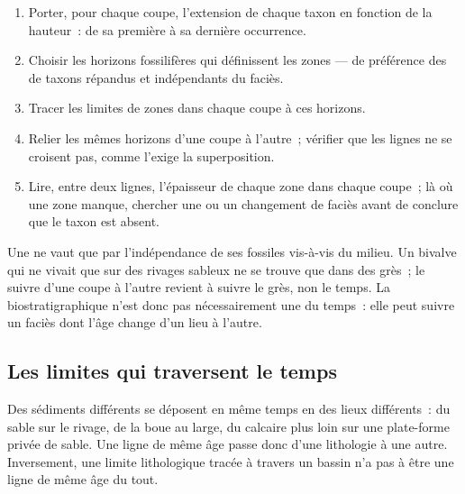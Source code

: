 \begin{method}\label{met:b1:stratigraphic-scale:biozones}
\begin{enumerate}
  \item Porter, pour chaque coupe, l'extension de chaque taxon en fonction de la hauteur~: de
        sa première à sa dernière occurrence.
  \item Choisir les horizons fossilifères qui définissent les zones --- de préférence des  de taxons répandus et indépendants du faciès.
  \item Tracer les limites de zones dans chaque coupe à ces horizons.
  \item Relier les mêmes horizons d'une coupe à l'autre~; vérifier que les lignes
        ne se croisent pas, comme l'exige la superposition.
  \item Lire, entre deux lignes, l'épaisseur de chaque zone dans chaque coupe~;
        là où une zone manque, chercher une  ou un changement de
        faciès avant de conclure que le taxon est absent.
\end{enumerate}
\end{method}

Une  ne vaut que par l'indépendance de ses fossiles vis-à-vis du
milieu. Un bivalve qui ne vivait que sur des rivages sableux ne se trouve que dans des
grès~; le suivre d'une coupe à l'autre revient à suivre le grès, non le
temps. La  biostratigraphique n'est donc pas nécessairement une 
du temps~: elle peut suivre un faciès dont l'âge change d'un lieu à l'autre.

\subsection*{Les limites qui traversent le temps}

Des sédiments différents se déposent en même temps en des lieux différents~: du sable sur
le rivage, de la boue au large, du calcaire plus loin sur une plate-forme privée de sable. Une ligne de
même âge passe donc d'une lithologie à une autre. Inversement, une
limite lithologique tracée à travers un bassin n'a pas à être une ligne de même âge
du tout.

